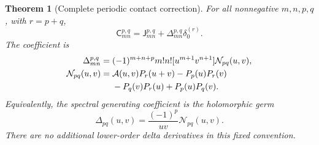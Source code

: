 \documentclass[11pt,a4paper]{article}
\numberwithin{equation}{section}
\newtheorem{theorem}{Theorem}[section]
\theoremstyle{definition}
\newcommand{\Jf}{\mathsf J}
\newcommand{\Cf}{\mathsf C}
\newcommand{\Af}{\mathcal A}
\begin{document}
\begin{theorem}[Complete periodic contact correction]\label{pc:main}
For all nonnegative $m,n,p,q$, with $r=p+q$,
\begin{equation}\label{pc:mainformula}
 \boxed{\ \Cf_{mn}^{p,q}=\Jf_{mn}^{p,q}
                     +\Delta_{mn}^{p,q}\delta_0^{(r)}.\ }
\end{equation}
The coefficient is
\begin{align}\label{pc:deltacoeff}
 \Delta_{mn}^{p,q}={}&(-1)^{m+n+p}m!n![u^{m+1}v^{n+1}]\mathcal N_{pq}(u,v),\\
 \mathcal N_{pq}(u,v)={}&\Af(u,v)P_r(u+v)-P_p(u)P_r(v)\notag\\
 &-P_q(v)P_r(u)+P_p(u)P_q(v).\label{pc:N}
\end{align}
Equivalently, the spectral generating coefficient is the holomorphic germ
\begin{equation}\label{pc:Deltagen}
 \Delta_{pq}(u,v)=\frac{(-1)^p}{uv}\mathcal N_{pq}(u,v).
\end{equation}
There are no additional lower-order delta derivatives in this fixed convention.
\end{theorem}
\end{document}
